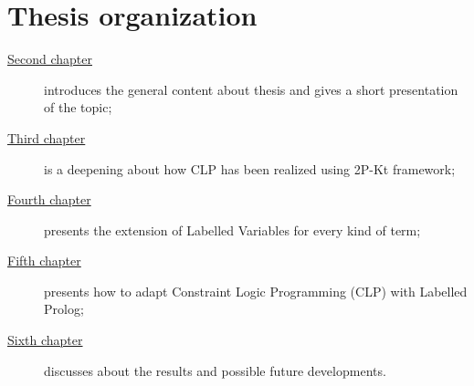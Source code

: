 \section{Thesis organization}\label{sec:thesis-organization}
\begin{description}
    \item[{\hyperref[ch:background-notions]{Second chapter}}] introduces the general content about thesis and gives a short presentation of the topic;

    \item[{\hyperref[ch:clp_2p_kt]{Third chapter}}] is a deepening about how CLP has been realized using 2P-Kt framework;

    \item[{\hyperref[ch:labelled_prolog]{Fourth chapter}}] presents the extension of Labelled Variables for every kind of term;

    \item[{\hyperref[ch:clp_labeled_prolog]{Fifth chapter}}] presents how to adapt Constraint Logic Programming (CLP) with Labelled Prolog;

    \item[{\hyperref[ch:conclusions]{Sixth chapter}}] discusses about the results and possible future developments.
\end{description}